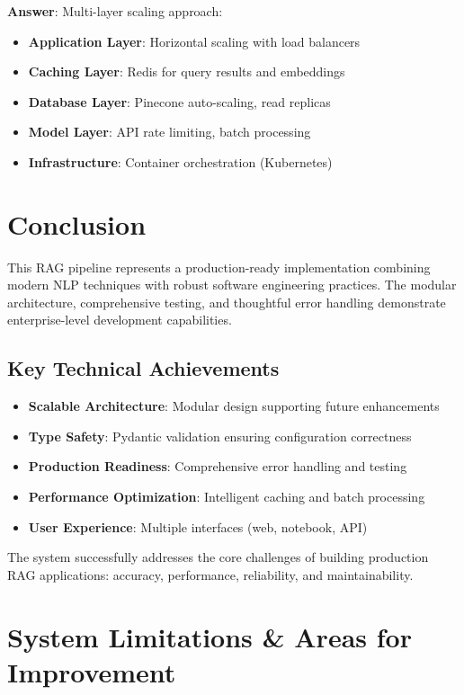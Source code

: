 \documentclass[12pt,a4paper]{article}
\begin{document}
\textbf{Answer}: Multi-layer scaling approach:
\begin{itemize}
    \item \textbf{Application Layer}: Horizontal scaling with load balancers
    \item \textbf{Caching Layer}: Redis for query results and embeddings
    \item \textbf{Database Layer}: Pinecone auto-scaling, read replicas
    \item \textbf{Model Layer}: API rate limiting, batch processing
    \item \textbf{Infrastructure}: Container orchestration (Kubernetes)
\end{itemize}

\section{Conclusion}

This RAG pipeline represents a production-ready implementation combining modern NLP techniques with robust software engineering practices. The modular architecture, comprehensive testing, and thoughtful error handling demonstrate enterprise-level development capabilities.

\subsection{Key Technical Achievements}

\begin{itemize}
    \item \textbf{Scalable Architecture}: Modular design supporting future enhancements
    \item \textbf{Type Safety}: Pydantic validation ensuring configuration correctness
    \item \textbf{Production Readiness}: Comprehensive error handling and testing
    \item \textbf{Performance Optimization}: Intelligent caching and batch processing
    \item \textbf{User Experience}: Multiple interfaces (web, notebook, API)
\end{itemize}

The system successfully addresses the core challenges of building production RAG applications: accuracy, performance, reliability, and maintainability.

\section{System Limitations \& Areas for Improvement}
\end{document}
